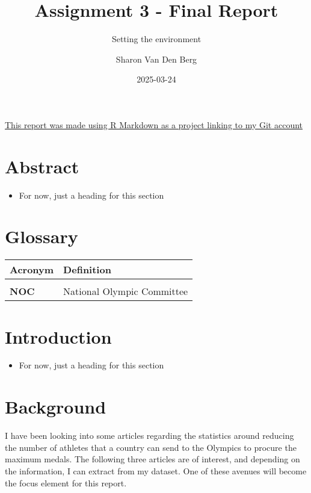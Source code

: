 \documentclass[
]{article}
\title{Assignment 3 - Final Report}
\subtitle{Setting the environment}
\author{Sharon Van Den Berg}
\date{2025-03-24}
\providecommand{\tightlist}{%
  \setlength{\itemsep}{0pt}\setlength{\parskip}{0pt}}
\begin{document}
\maketitle

{
\setcounter{tocdepth}{2}
\tableofcontents
}
\href{https://github.com/stvdb914/DSAA811-Preliminary-Report}{This report was made using R Markdown as a project linking to my Git account}

\newpage

\section{Abstract}\label{abstract}

\begin{itemize}
\tightlist
\item
  For now, just a heading for this section
\end{itemize}

\section{Glossary}\label{glossary}

\begin{longtable}[l]{>{}ll}
\toprule
Acronym & Definition\\
\midrule
\textbf{\cellcolor{gray!10}{DUMMY}} & \cellcolor{gray!10}{Testing to see if two rows ccan be printed}\\
\textbf{NOC} & National Olympic Committee\\
\bottomrule
\end{longtable}

  \newpage
  \tableofcontents
  \newpage

\section{Introduction}\label{introduction}

\begin{itemize}
\tightlist
\item
  For now, just a heading for this section
\end{itemize}

\section{Background}\label{background}

I have been looking into some articles regarding the statistics around reducing the number of athletes that a country can send to the Olympics to procure the maximum medals. The following three articles are of interest, and depending on the information, I can extract from my dataset. One of these avenues will become the focus element for this report.
\end{document}
